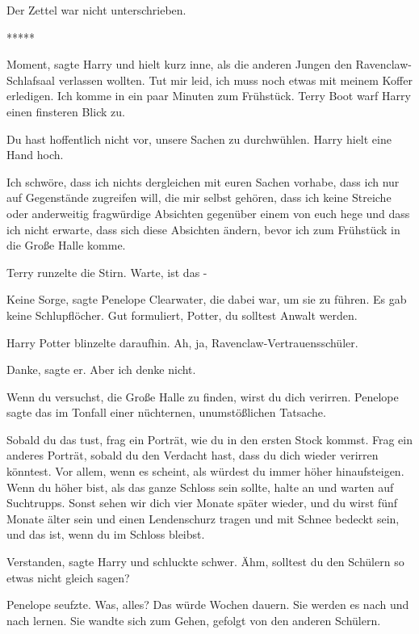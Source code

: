 Der Zettel war nicht unterschrieben.

\begin{center}*****\end{center}

\glqq{}Moment\grqq{}, sagte Harry und hielt kurz inne, als die anderen Jungen den
Ravenclaw-Schlafsaal verlassen wollten. \glqq{}Tut mir leid, ich muss noch etwas
mit meinem Koffer erledigen. Ich komme in ein paar Minuten zum Frühstück.\grqq{}
Terry Boot warf Harry einen finsteren Blick zu.

\glqq{}Du hast hoffentlich nicht vor, unsere Sachen zu durchwühlen.\grqq{} Harry
hielt eine Hand hoch.

\glqq{}Ich schwöre, dass ich nichts dergleichen mit euren Sachen vorhabe, dass
ich nur auf Gegenstände zugreifen will, die mir selbst gehören, dass ich keine
Streiche oder anderweitig fragwürdige Absichten gegenüber einem von euch hege
und dass ich nicht erwarte, dass sich diese Absichten ändern, bevor ich zum
Frühstück in die Große Halle komme.\grqq{}

Terry runzelte die Stirn. \glqq{}Warte, ist das -\grqq{}

\glqq{}Keine Sorge\grqq{}, sagte Penelope Clearwater, die dabei war, um sie zu
führen. \glqq{}Es gab keine Schlupflöcher. Gut formuliert, Potter, du solltest
Anwalt werden.\grqq{}

Harry Potter blinzelte daraufhin. Ah, ja, Ravenclaw-Vertrauensschüler.

\glqq{}Danke\grqq{}, sagte er. \glqq{}Aber ich denke nicht.\grqq{}

\glqq{}Wenn du versuchst, die Große Halle zu finden, wirst du dich
verirren.\grqq{} Penelope sagte das im Tonfall einer nüchternen, unumstößlichen
Tatsache.

\glqq{}Sobald du das tust, frag ein Porträt, wie du in den ersten Stock kommst.
Frag ein anderes Porträt, sobald du den Verdacht hast, dass du dich wieder
verirren könntest. Vor allem, wenn es scheint, als würdest du immer höher
hinaufsteigen. Wenn du höher bist, als das ganze Schloss sein sollte, halte an
und warten auf Suchtrupps. Sonst sehen wir dich vier Monate später wieder, und
du wirst fünf Monate älter sein und einen Lendenschurz tragen und mit Schnee
bedeckt sein, und das ist, wenn du im Schloss bleibst.\grqq{}

\glqq{}Verstanden\grqq{}, sagte Harry und schluckte schwer. \glqq{}Ähm, solltest
du den Schülern so etwas nicht gleich sagen?\grqq{}

Penelope seufzte. \glqq{}Was, alles? Das würde Wochen dauern. Sie werden es nach
und nach lernen.\grqq{} Sie wandte sich zum Gehen, gefolgt von den anderen
Schülern.


